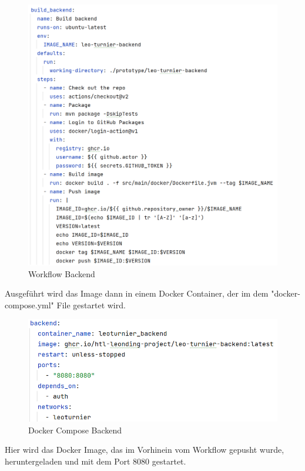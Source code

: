 \begin{figure}[H]
    \includegraphics[scale=0.4]{pics/docker/workflow_backend.png}
    \caption{Workflow Backend}
\end{figure}

Ausgeführt wird das Image dann in einem Docker Container, der im dem "docker-compose.yml" File gestartet wird. 

\begin{figure}[H]
    \includegraphics[scale=0.4]{pics/docker/docker-compose_backend.png}
    \caption{Docker Compose Backend}
\end{figure}

Hier wird das Docker Image, das im Vorhinein vom Workflow gepusht wurde, heruntergeladen und mit dem Port 8080 gestartet.

